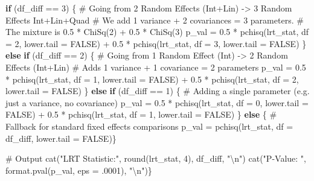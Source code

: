 \documentclass[
  12pt,
]{article}
\newenvironment{Shaded}{\begin{snugshade}}{\end{snugshade}}
\newcommand{\AttributeTok}[1]{\textcolor[rgb]{0.40,0.45,0.13}{#1}}
\newcommand{\CommentTok}[1]{\textcolor[rgb]{0.37,0.37,0.37}{#1}}
\newcommand{\ConstantTok}[1]{\textcolor[rgb]{0.56,0.35,0.01}{#1}}
\newcommand{\ControlFlowTok}[1]{\textcolor[rgb]{0.00,0.23,0.31}{\textbf{#1}}}
\newcommand{\DecValTok}[1]{\textcolor[rgb]{0.68,0.00,0.00}{#1}}
\newcommand{\FloatTok}[1]{\textcolor[rgb]{0.68,0.00,0.00}{#1}}
\newcommand{\FunctionTok}[1]{\textcolor[rgb]{0.28,0.35,0.67}{#1}}
\newcommand{\NormalTok}[1]{\textcolor[rgb]{0.00,0.23,0.31}{#1}}
\newcommand{\OtherTok}[1]{\textcolor[rgb]{0.00,0.23,0.31}{#1}}
\newcommand{\SpecialCharTok}[1]{\textcolor[rgb]{0.37,0.37,0.37}{#1}}
\newcommand{\StringTok}[1]{\textcolor[rgb]{0.13,0.47,0.30}{#1}}
\begin{document}
\begin{Shaded}
\begin{Highlighting}[]
  \ControlFlowTok{if}\NormalTok{ (df\_diff }\SpecialCharTok{==} \DecValTok{3}\NormalTok{) \{}
    \CommentTok{\# Going from 2 Random Effects (Int+Lin) {-}\textgreater{} 3 Random Effects Int+Lin+Quad}
    \CommentTok{\# We add 1 variance + 2 covariances = 3 parameters.}
    \CommentTok{\# The mixture is 0.5 * ChiSq(2) + 0.5 * ChiSq(3)}
\NormalTok{    p\_val }\OtherTok{=} \FloatTok{0.5} \SpecialCharTok{*} \FunctionTok{pchisq}\NormalTok{(lrt\_stat, }\AttributeTok{df =} \DecValTok{2}\NormalTok{, }\AttributeTok{lower.tail =} \ConstantTok{FALSE}\NormalTok{) }\SpecialCharTok{+} 
      \FloatTok{0.5} \SpecialCharTok{*} \FunctionTok{pchisq}\NormalTok{(lrt\_stat, }\AttributeTok{df =} \DecValTok{3}\NormalTok{, }\AttributeTok{lower.tail =} \ConstantTok{FALSE}\NormalTok{)}
\NormalTok{    \} }\ControlFlowTok{else} \ControlFlowTok{if}\NormalTok{ (df\_diff }\SpecialCharTok{==} \DecValTok{2}\NormalTok{) \{}
    \CommentTok{\# Going from 1 Random Effect (Int) {-}\textgreater{} 2 Random Effects (Int+Lin)}
    \CommentTok{\# Adds 1 variance + 1 covariance = 2 parameters}
\NormalTok{    p\_val }\OtherTok{=} \FloatTok{0.5} \SpecialCharTok{*} \FunctionTok{pchisq}\NormalTok{(lrt\_stat, }\AttributeTok{df =} \DecValTok{1}\NormalTok{, }\AttributeTok{lower.tail =} \ConstantTok{FALSE}\NormalTok{) }\SpecialCharTok{+} 
      \FloatTok{0.5} \SpecialCharTok{*} \FunctionTok{pchisq}\NormalTok{(lrt\_stat, }\AttributeTok{df =} \DecValTok{2}\NormalTok{, }\AttributeTok{lower.tail =} \ConstantTok{FALSE}\NormalTok{)}
\NormalTok{    \} }\ControlFlowTok{else} \ControlFlowTok{if}\NormalTok{ (df\_diff }\SpecialCharTok{==} \DecValTok{1}\NormalTok{) \{}
    \CommentTok{\# Adding a single parameter (e.g. just a variance, no covariance)}
\NormalTok{    p\_val }\OtherTok{=} \FloatTok{0.5} \SpecialCharTok{*} \FunctionTok{pchisq}\NormalTok{(lrt\_stat, }\AttributeTok{df =} \DecValTok{0}\NormalTok{, }\AttributeTok{lower.tail =} \ConstantTok{FALSE}\NormalTok{) }\SpecialCharTok{+} 
      \FloatTok{0.5} \SpecialCharTok{*} \FunctionTok{pchisq}\NormalTok{(lrt\_stat, }\AttributeTok{df =} \DecValTok{1}\NormalTok{, }\AttributeTok{lower.tail =} \ConstantTok{FALSE}\NormalTok{)}
\NormalTok{    \} }\ControlFlowTok{else}\NormalTok{ \{}
    \CommentTok{\# Fallback for standard fixed effects comparisons}
\NormalTok{    p\_val }\OtherTok{=} \FunctionTok{pchisq}\NormalTok{(lrt\_stat, }\AttributeTok{df =}\NormalTok{ df\_diff, }\AttributeTok{lower.tail =} \ConstantTok{FALSE}\NormalTok{)\}}
  
  \CommentTok{\# Output}
  \FunctionTok{cat}\NormalTok{(}\StringTok{"LRT Statistic:"}\NormalTok{, }\FunctionTok{round}\NormalTok{(lrt\_stat, }\DecValTok{4}\NormalTok{),  df\_diff, }\StringTok{"}\SpecialCharTok{\textbackslash{}n}\StringTok{"}\NormalTok{)}
  \FunctionTok{cat}\NormalTok{(}\StringTok{"P{-}Value:       "}\NormalTok{, }\FunctionTok{format.pval}\NormalTok{(p\_val, }\AttributeTok{eps =}\NormalTok{ .}\DecValTok{0001}\NormalTok{), }\StringTok{"}\SpecialCharTok{\textbackslash{}n}\StringTok{"}\NormalTok{)\}}
\end{Highlighting}
\end{Shaded}
\end{document}
